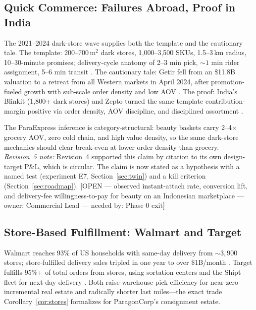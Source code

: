 \documentclass[10pt,twocolumn,letterpaper]{article}
\theoremstyle{definition}
\newcommand{\OPEN}[3]{{\color{openred}\footnotesize\textsf{[OPEN --- #1 --- owner: #2 --- needed by: #3]}}}
\begin{document}
\subsection{Quick Commerce: Failures Abroad, Proof in India}
The 2021--2024 dark-store wave supplies both the template and the cautionary tale. The template: 200--700\,m$^2$ dark stores, 1,000--3,500 SKUs, 1.5--3\,km radius, 10--30-minute promises; delivery-cycle anatomy of 2--3 min pick, ${\sim}1$ min rider assignment, 5--6 min transit \cite{suitefleet2025,storyboard2025}. The cautionary tale: Getir fell from an \$11.8B valuation to a retreat from all Western markets in April 2024, after promotion-fueled growth with sub-scale order density and low AOV \cite{browne2024,sifted2024}. The proof: India's Blinkit (1,800+ dark stores) and Zepto turned the same template contribution-margin positive via order density, AOV discipline, and disciplined assortment \cite{mohan2025,storyboard2025}.

The ParaExpress inference is category-structural: beauty baskets carry 2--4$\times$ grocery AOV, zero cold chain, and high value density, so the same dark-store mechanics should clear break-even at lower order density than grocery. \emph{Revision~5 note:} Revision~4 supported this claim by citation to its own design-target P\&L, which is circular. The claim is now stated as a hypothesis with a named test (experiment E7, Section~\ref{sec:twin}) and a kill criterion (Section~\ref{sec:roadmap}). \OPEN{observed instant-attach rate, conversion lift, and delivery-fee willingness-to-pay for beauty on an Indonesian marketplace}{Commercial Lead}{Phase 0 exit}

\subsection{Store-Based Fulfillment: Walmart and Target}
Walmart reaches 93\% of US households with same-day delivery from ${\sim}3{,}900$ stores; store-fulfilled delivery sales tripled in one year to over \$1B/month \cite{scd2025}. Target fulfills 95\%+ of total orders from stores, using sortation centers and the Shipt fleet for next-day delivery \cite{target2023}. Both raise warehouse pick efficiency for near-zero incremental real estate and radically shorter last miles---the exact trade Corollary~\ref{cor:stores} formalizes for ParagonCorp's consignment estate.
\end{document}
